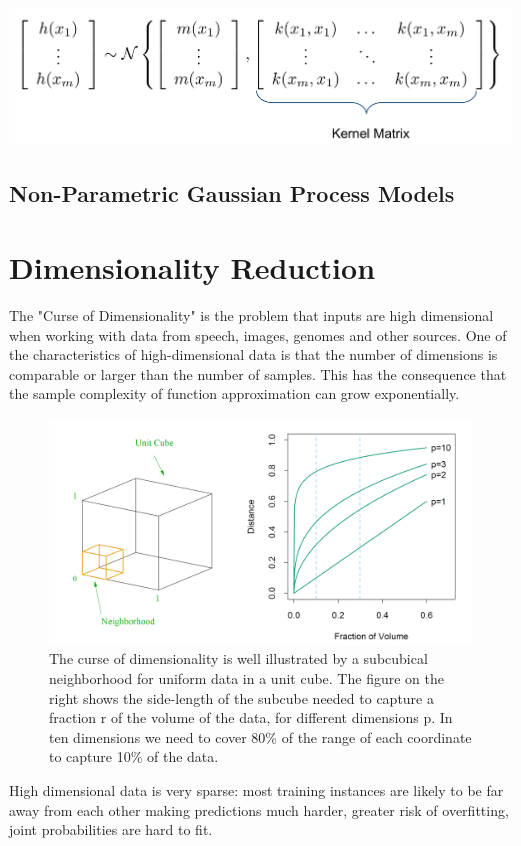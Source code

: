 \documentclass[11pt]{article}
\theoremstyle{definition}
\begin{document}
\begin{center}
	\includegraphics[width=0.8\linewidth]{img/gaussian_processes}
\end{center}

\subsection{Non-Parametric Gaussian Process Models}


\section{Dimensionality Reduction}
The "Curse of Dimensionality" is the problem that inputs are high dimensional when working with data from speech, images, genomes and other sources. One of the characteristics of high-dimensional data is that the number of dimensions is comparable or larger than the number of samples. This has the consequence that the sample complexity of function approximation can grow exponentially.

\begin{figure}[H]
	\centering
	\includegraphics[width=0.6\linewidth]{img/curse_dimensionality}
	\caption{The curse of dimensionality is well illustrated by a subcubical neighborhood for uniform data in a unit cube. The figure on the right shows the side-length of the subcube needed to capture a fraction r of the volume of the data, for different dimensions p. In ten dimensions we need to cover 80\% of the range of each coordinate to capture 10\% of the data.}
	\label{fig:cursedimensionality}
\end{figure}

High dimensional data is very sparse: most training instances are likely to be far away from each other making predictions much harder, greater risk of overfitting, joint probabilities are hard to fit.
\end{document}
